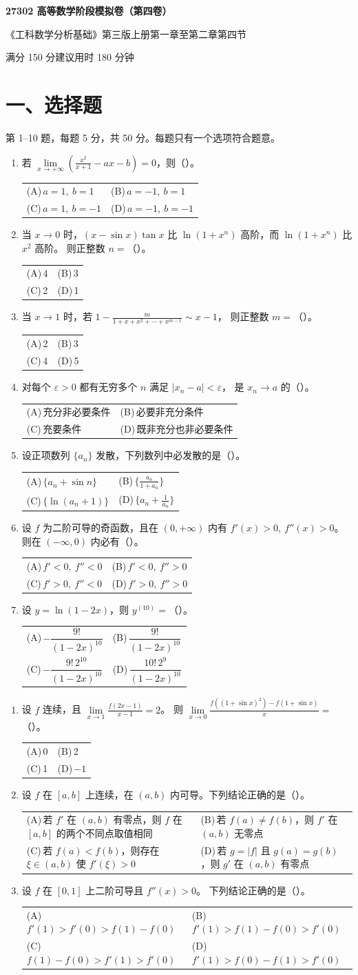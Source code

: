 \documentclass[UTF8,a4paper,zihao=-4,fontset=fandol]{ctexart}
\makeatletter
\renewcommand{\lim}{\operatorname*{lim}\limits}
\newcommand{\choices}[4]{%
  \par\noindent\begin{tabularx}{\linewidth}{@{}X@{\hspace{1em}}X@{}}
    (A)\,#1 & (B)\,#2 \\
    (C)\,#3 & (D)\,#4
  \end{tabularx}\par}
\newcommand{\paper}[1]{%
  \pdfbookmark[0]{第#1卷}{paper.\thepage}%
  \begin{center}
    {\LARGE\bfseries 27302 高等数学阶段模拟卷（第#1卷）\par}
    \small 《工科数学分析基础》第三版上册第一章至第二章第四节\par
    满分 150 分\qquad 建议用时 180 分钟
  \end{center}
  \section*{一、选择题}
  第 1--10 题，每题 5 分，共 50 分。每题只有一个选项符合题意。}
\makeatother
\begin{document}
\newpage
\paper{四}
\begin{enumerate}
\item 若 $\displaystyle\lim_{x\to+\infty}\left(\frac{x^2}{x+1}-ax-b\right)=0$，则（\quad）。
\choices{$a=1,\ b=1$}{$a=-1,\ b=1$}{$a=1,\ b=-1$}{$a=-1,\ b=-1$}
\item 当 $x\to0$ 时，$(x-\sin x)\tan x$ 比 $\ln(1+x^n)$ 高阶，而 $\ln(1+x^n)$ 比 $x^2$ 高阶。
则正整数 $n=$（\quad）。
\choices{4}{3}{2}{1}
\item 当 $x\to1$ 时，若 $\displaystyle 1-\frac{m}{1+x+x^2+\cdots+x^{m-1}}\sim x-1$，
则正整数 $m=$（\quad）。
\choices{2}{3}{4}{5}
\item 对每个 $\varepsilon>0$ 都有无穷多个 $n$ 满足 $|x_n-a|<\varepsilon$，
是 $x_n\to a$ 的（\quad）。
\choices{充分非必要条件}{必要非充分条件}{充要条件}{既非充分也非必要条件}
\item 设正项数列 $\{a_n\}$ 发散，下列数列中必发散的是（\quad）。
\choices{$\{a_n+\sin n\}$}{$\{\frac{a_n}{1+a_n}\}$}{$\{\ln(a_n+1)\}$}{$\{a_n+\frac{1}{a_n}\}$}
\item 设 $f$ 为二阶可导的奇函数，且在 $(0,+\infty)$ 内有 $f'(x)>0,\ f''(x)>0$。
则在 $(-\infty,0)$ 内必有（\quad）。
\choices{$f'<0,\ f''<0$}{$f'<0,\ f''>0$}{$f'>0,\ f''<0$}{$f'>0,\ f''>0$}
\item 设 $y=\ln(1-2x)$，则 $y^{(10)}=$（\quad）。
\choices{$-\dfrac{9!}{(1-2x)^{10}}$}{$\dfrac{9!}{(1-2x)^{10}}$}
{$-\dfrac{9!\,2^{10}}{(1-2x)^{10}}$}{$\dfrac{10!\,2^9}{(1-2x)^{10}}$}
\end{enumerate}
\newpage
\begin{enumerate}[start=8]
\item 设 $f$ 连续，且 $\displaystyle\lim_{x\to1}\frac{f(2x-1)}{x-1}=2$。
则 $\displaystyle\lim_{x\to0}\frac{f((1+\sin x)^2)-f(1+\sin x)}{x}=$（\quad）。
\choices{0}{2}{1}{$-1$}
\item 设 $f$ 在 $[a,b]$ 上连续，在 $(a,b)$ 内可导。下列结论正确的是（\quad）。
\choices{若 $f'$ 在 $(a,b)$ 有零点，则 $f$ 在 $[a,b]$ 的两个不同点取值相同}
{若 $f(a)\ne f(b)$，则 $f'$ 在 $(a,b)$ 无零点}
{若 $f(a)<f(b)$，则存在 $\xi\in(a,b)$ 使 $f'(\xi)>0$}
{若 $g=|f|$ 且 $g(a)=g(b)$，则 $g'$ 在 $(a,b)$ 有零点}
\item 设 $f$ 在 $[0,1]$ 上二阶可导且 $f''(x)>0$。
下列结论正确的是（\quad）。
\choices{$f'(1)>f'(0)>f(1)-f(0)$}{$f'(1)>f(1)-f(0)>f'(0)$}
{$f(1)-f(0)>f'(1)>f'(0)$}{$f'(1)>f(0)-f(1)>f'(0)$}
\end{enumerate}
\end{document}
